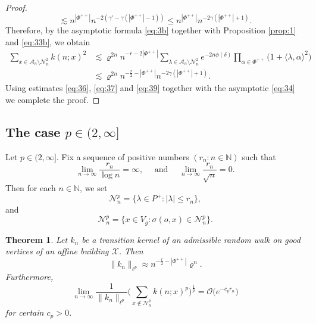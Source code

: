 \documentclass[11pt]{amsart}
\newcommand{\NN}{\mathbb{N}}
\newcommand{\calO}{\mathcal{O}}
\newcommand{\calA}{\mathcal{A}}
\newcommand{\calN}{\mathcal{N}}
\newcommand{\scrX}{\mathscr{X}}
\newcommand{\scrA}{\mathscr{A}}
\newcommand{\scrN}{\mathscr{N}}
\newcommand{\sprod}[2]{\langle {#1}, {#2} \rangle}
\theoremstyle{plain}
\newcounter{thm}
\newtheorem{theorem}{Theorem}[section]
\theoremstyle{definition}
\numberwithin{equation}{section}
\begin{document}
\begin{proof}
\[		\lesssim 
		n^{|\Phi^{++}|} n^{-2(\gamma' - \gamma (|\Phi^{++}| - 1))}
		\leqslant
		n^{|\Phi^{++}|} n^{-2\gamma (|\Phi^{++}| + 1)}.
	\]
	Therefore, by the asymptotic formula \eqref{eq:3b} together with Proposition \ref{prop:1} and \eqref{eq:33b}, we obtain
	\begin{align}
		\nonumber
		\sum_{x \in \scrA_n \setminus \scrN_n^2}
		k(n; x)^2
		&\lesssim
		\varrho^{2n} n^{-r - 2 |\Phi^{++}|} 
		\sum_{\lambda \in \calA_n \setminus \calN_n^2}
		e^{-2n \phi(\delta)}
		\prod_{\alpha \in \Phi^{++}} \big(1 + \sprod{\lambda}{\alpha}^2\big) \\
		\label{eq:39}
		&\lesssim
		\varrho^{2n} n^{-\frac{r}2 - |\Phi^{++}|}  n^{-2\gamma (|\Phi^{++}| + 1)}.
	\end{align}
	Using estimates \eqref{eq:36}, \eqref{eq:37} and \eqref{eq:39} together with the asymptotic \eqref{eq:34} 
	we complete the proof.
\end{proof}
	
\subsection{The case $p \in (2, \infty]$}
\label{sec:2.3}
Let $p \in (2, \infty]$. Fix a sequence of positive numbers $(r_n : n \in \NN)$ such that
\begin{equation}
	\label{eq:40}
	\lim_{n \to \infty} \frac{r_n}{\log n} = \infty, \quad\text{ and }\quad \lim_{n \to \infty} \frac{r_n}{\sqrt{n}} = 0.
\end{equation}
Then for each $n \in \NN$, we set
\[
	\calN_n^p = \big\{\lambda \in P^+ : |\lambda| \leqslant r_n \big\},
\]
and
\begin{equation}
	\label{eq:4c}
	\scrN_n^p= \{x \in V_g : \sigma(o, x) \in \calN_n^p\}.
\end{equation}

\begin{theorem}
	\label{thm:3}
	Let $k_n$ be a transition kernel of an admissible random walk on good vertices of an affine building $\scrX$.
	Then
	\[
		\|k_n\|_{\ell^p} \approx 
		n^{-\frac{r}{2}-|\Phi^{++}|} \varrho^{n}.
	\]
	Furthermore,
	\[
		\lim_{n \to \infty}
		\frac{1}{\| k_n \|_{\ell^p}}
		\bigg(
		\sum_{x\notin \mathcal{N}_n^p} k(n; x)^p\bigg)^\frac{1}{p} = 
		\calO\Big(e^{-c_p r_n}\Big)
	\]
	for certain $c_p > 0$.
\end{theorem}
\end{document}
